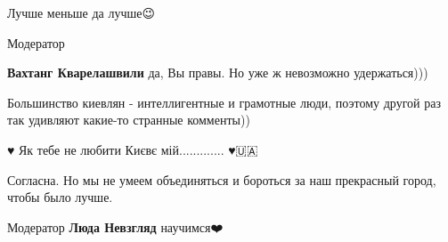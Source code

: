 \begin{itemize}
\begin{itemize}
\end{itemize}

 
Лучше меньше да лучше😉

\begin{itemize}
 
Модератор

\textbf{Вахтанг Кварелашвили} да, Вы правы. Но уже ж невозможно удержаться)))

Большинство киевлян - интеллигентные и грамотные люди, поэтому другой раз так
удивляют какие-то странные комменты))

\end{itemize}

 
♥️ Як тебе не любити Києвє мій............. ♥️🇺🇦


 
Согласна. Но мы не умеем объединяться и бороться за наш прекрасный город, чтобы было лучше.

\begin{itemize}
 
Модератор
\textbf{Люда Невзгляд} научимся❤️


 

\end{itemize}
\end{itemize}

